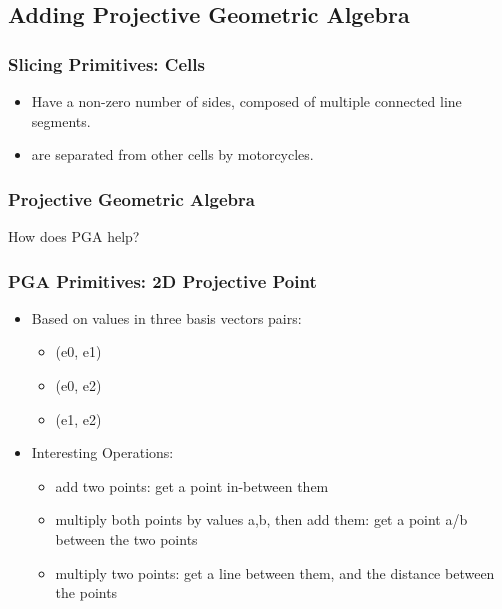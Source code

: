 \documentclass[hyperref={pdfpagemode=FullScreen},aspectratio=169]{beamer}
\begin{document}
\subsection{Adding Projective Geometric Algebra}

\begin{frame}
  \frametitle{Slicing Primitives: Cells}
  \begin{itemize}
  \item Have a non-zero number of sides, composed of multiple connected line segments.
  \item are separated from other cells by motorcycles.
  \end{itemize}
\end{frame}

\begin{frame}
  \frametitle{Projective Geometric Algebra}
  \Huge{\centerline{How does PGA help?}}
\end{frame}

\begin{frame}
  \frametitle{PGA Primitives: 2D Projective Point}
  \begin{itemize}
  \item Based on values in three basis vectors pairs:
    \begin {itemize}
    \item (e0, e1)
    \item (e0, e2)
    \item (e1, e2)
    \end{itemize}
  \item Interesting Operations:
    \begin {itemize}
    \item add two points: get a point in-between them
    \item multiply both points by values a,b, then add them: get a point a/b between the two points
    \item multiply two points: get a line between them, and the distance between the points
    \end{itemize}
  \end{itemize}
\end{frame}
\end{document}
